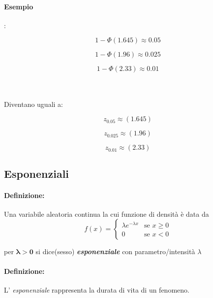 \documentclass[]{article}
\newcommand{\definizione}{\paragraph{Definizione:}}
\begin{document}
    \paragraph{Esempio}: \\
    \begin{minipage}{0.3\textwidth}
        \[ 1 - \Phi(1.645) \approx 0.05 \]
    \end{minipage}
    \begin{minipage}{0.3\textwidth}
        \[ 1 - \Phi(1.96) \approx 0.025 \]
    \end{minipage}
    \begin{minipage}{0.3\textwidth}
        \[ 1 - \Phi(2.33) \approx 0.01 \]
    \end{minipage} \\ \\
    Diventano uguali a: \\
    \begin{minipage}{0.3\textwidth}
        \[ z_{0.05} \approx (1.645) \]
    \end{minipage}
    \begin{minipage}{0.3\textwidth}
        \[ z_{0.025} \approx (1.96) \]
    \end{minipage}
    \begin{minipage}{0.3\textwidth}
        \[ z_{0.01} \approx (2.33) \]
    \end{minipage}

    \subsection{Esponenziali}
    \definizione Una variabile aleatoria continua la cui funzione di densità è data da 
    \begin{equation*}
        f(x) =
        \begin{cases}
            \lambda e^{-\lambda x} & \text{se } x \geq 0 \\
            0 & \text{se } x < 0
        \end{cases}
    \end{equation*}
    \centerline{per $\boldsymbol{\lambda > 0}$ si dice(sesso) \textbf{\textit{esponenziale}} con parametro/intensità $\lambda$}
    \definizione L' \textit{esponenziale} rappresenta la durata di vita di un fenomeno.
\end{document}
